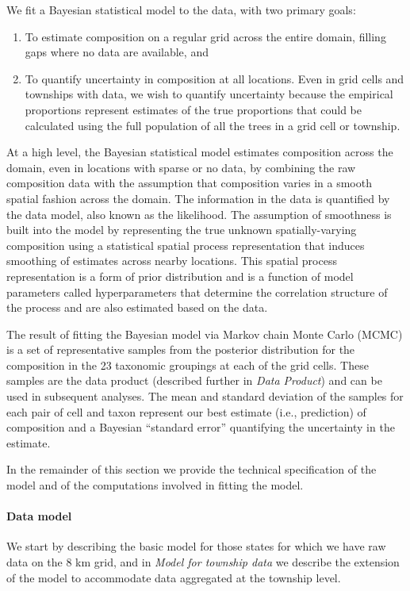 \documentclass[10pt,letterpaper]{article}
\begin{document}
We fit a Bayesian statistical model to the data, with two primary
goals:
\begin{enumerate}
\item To estimate composition on a regular grid across the entire domain,
filling gaps where no data are available, and
\item To quantify uncertainty in composition at all locations. Even in grid
cells and townships with data, we wish to quantify uncertainty because
the empirical proportions represent estimates of the true proportions
that could be calculated using the full population of all the trees
in a grid cell or township.
\end{enumerate}
At a high level, the Bayesian statistical model estimates
composition across the domain, even in locations with sparse or no
data, by combining the raw composition data with the assumption that
composition varies in a smooth spatial fashion across the domain.
The information in the data is quantified by the data model, also
known as the likelihood. The assumption of smoothness is built into
the model by representing the true unknown spatially-varying composition
using a statistical spatial process representation that induces smoothing
of estimates across nearby locations. This spatial process representation
is a form of prior distribution and is a function of model parameters
called hyperparameters that determine the correlation structure of
the process and are also estimated based on the data. 

The result of fitting the Bayesian model via Markov chain Monte Carlo
(MCMC) is a set of representative samples from the posterior distribution
for the composition in the 23 taxonomic groupings at each of the grid
cells. These samples are the data product (described further in
\emph{Data Product}) and can be used in subsequent analyses.
The mean and standard deviation of the samples for each pair of cell
and taxon represent our best estimate (i.e., prediction) of composition
and a Bayesian ``standard error'' quantifying the uncertainty in
the estimate. 

In the remainder of this section we provide the technical
specification of the model and of the computations involved in fitting
the model.



\paragraph*{Data model}

We start by describing the basic model for those states for which
we have raw data on the 8 km grid, and in \emph{Model for township data}
we describe the extension of the model to accommodate data aggregated
at the township level.
\end{document}
